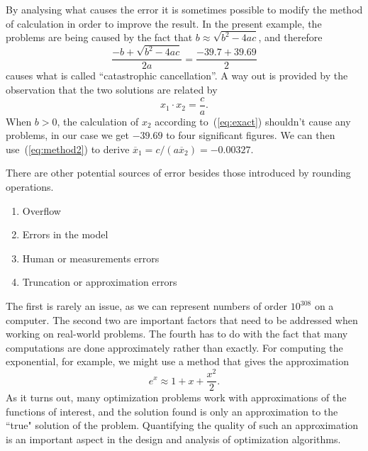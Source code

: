 \begin{example}
By analysing what causes the error it is sometimes possible to modify the method of calculation in order to improve the result. 
In the present example, the problems are being caused by the fact that $b\approx \sqrt{b^2-4ac}$, and therefore
\begin{equation*}
  \frac{-b+\sqrt{b^2-4ac}}{2a} = \frac{-39.7+39.69}{2}
\end{equation*}
causes what is called ``catastrophic cancellation''. A way out is provided by the observation that the two solutions are related by 
\begin{equation}\label{eq:method2}
  x_1 \cdot x_2 = \frac{c}{a}.
\end{equation}
When $b>0$, the calculation of $x_2$ according to~(\ref{eq:exact}) shouldn't cause any problems, in our case we get $-39.69$ to four significant figures.
We can then use~(\ref{eq:method2}) to derive $\overline{x}_1=c/(a\overline{x}_2)=-0.00327$. 
\end{example}

There are other potential sources of error besides those introduced by rounding operations.

\begin{enumerate}
\item Overflow
\item Errors in the model
\item Human or measurements errors
\item Truncation or approximation errors
\end{enumerate}

The first is rarely an issue, as we can represent numbers of order $10^{308}$ on a computer.
The second two are important factors that need to be addressed when working on real-world problems. The fourth has to do with the fact that many computations are done approximately
rather than exactly. For computing the exponential, for example, we might use a method that gives the approximation
\begin{equation*}
  e^x \approx 1+x+\frac{x^2}{2}.
\end{equation*}
As it turns out, many optimization problems work with approximations of the functions of interest, and the solution found is only an approximation to the ``true" solution of the problem. Quantifying the quality of such an approximation is an important aspect in the design and analysis of optimization algorithms.

